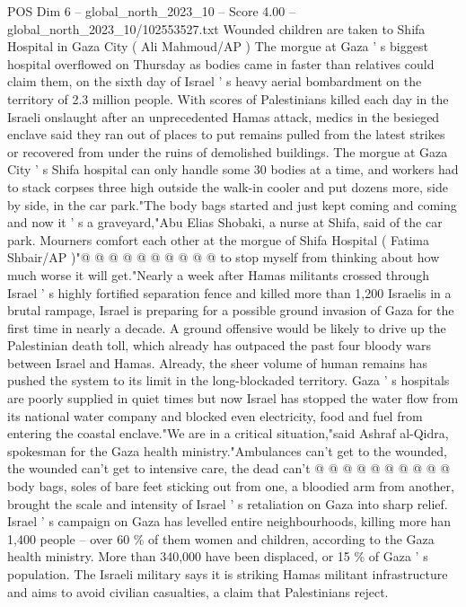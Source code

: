 \begin{textsample}{POS Dim 6 – global\_north\_2023\_10 – Score 4.00 – global\_north\_2023\_10/102553527.txt}  \label{ex:f6_pos_248}
Wounded children are taken to Shifa Hospital in Gaza City ( Ali Mahmoud/AP ) The morgue at Gaza ' s biggest hospital overflowed on Thursday as bodies came in faster than relatives could claim them, on the sixth day of Israel ' s heavy aerial bombardment on the territory of 2.3 million people.
With scores of Palestinians killed each day in the Israeli onslaught after an unprecedented Hamas attack, medics in the besieged enclave said they ran out of places to put remains pulled from the latest strikes or recovered from under the ruins of demolished buildings.
The morgue at Gaza City ' s Shifa hospital can only handle some 30 bodies at a time, and workers had to stack corpses three high outside the walk-in cooler and put dozens more, side by side, in the car park."The body bags started and just kept coming and coming and now it ' s a graveyard,"Abu Elias Shobaki, a nurse at Shifa, said of the car park.
Mourners comfort each other at the morgue of Shifa Hospital ( Fatima Shbair/AP )"@ @ @ @ @ @ @ @ @ @ to stop myself from thinking about how much worse it will get."Nearly a week after Hamas militants crossed through Israel ' s highly fortified separation fence and killed more than 1,200 Israelis in a brutal rampage, Israel is preparing for a possible ground invasion of Gaza for the first time in nearly a decade.
A ground offensive would be likely to drive up the Palestinian death toll, which already has outpaced the past four bloody wars between Israel and Hamas.
Already, the sheer volume of human remains has pushed the system to its limit in the long-blockaded territory.
Gaza ' s hospitals are poorly supplied in quiet times but now Israel has stopped the water flow from its national water company and blocked even electricity, food and fuel from entering the coastal enclave."We are in a critical situation,"said Ashraf al-Qidra, spokesman for the Gaza health ministry."Ambulances can't get to the wounded, the wounded can't get to intensive care, the dead can't @ @ @ @ @ @ @ @ @ @ body bags, soles of bare feet sticking out from one, a bloodied arm from another, brought the scale and intensity of Israel ' s retaliation on Gaza into sharp relief.
Israel ' s campaign on Gaza has levelled entire neighbourhoods, killing more han 1,400 people -- over 60 \% of them women and children, according to the Gaza health ministry.
More than 340,000 have been displaced, or 15 \% of Gaza ' s population.
The Israeli military says it is striking Hamas militant infrastructure and aims to avoid civilian casualties, a claim that Palestinians reject.

\end{textsample}

